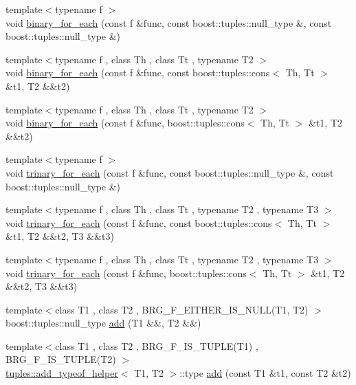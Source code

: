 \begin{DoxyCompactItemize}
\item 
{\footnotesize template$<$typename f $>$ }\\void \hyperlink{namespaceIceBRG_abb18e99d1d2a8d9d4bb6c7a7c6bf612e}{binary\+\_\+for\+\_\+each} (const f \&func, const boost\+::tuples\+::null\+\_\+type \&, const boost\+::tuples\+::null\+\_\+type \&)
\item 
{\footnotesize template$<$typename f , class Th , class Tt , typename T2 $>$ }\\void \hyperlink{namespaceIceBRG_aad1e93a9503d54382cc33627a2fc3fd2}{binary\+\_\+for\+\_\+each} (const f \&func, const boost\+::tuples\+::cons$<$ Th, Tt $>$ \&t1, T2 \&\&t2)
\item 
{\footnotesize template$<$typename f , class Th , class Tt , typename T2 $>$ }\\void \hyperlink{namespaceIceBRG_a493a5731d276b5caebf58044bd458dd8}{binary\+\_\+for\+\_\+each} (const f \&func, boost\+::tuples\+::cons$<$ Th, Tt $>$ \&t1, T2 \&\&t2)
\item 
{\footnotesize template$<$typename f $>$ }\\void \hyperlink{namespaceIceBRG_a6a88a4930e8c382bce5d55d4630c131f}{trinary\+\_\+for\+\_\+each} (const f \&func, const boost\+::tuples\+::null\+\_\+type \&, const boost\+::tuples\+::null\+\_\+type \&)
\item 
{\footnotesize template$<$typename f , class Th , class Tt , typename T2 , typename T3 $>$ }\\void \hyperlink{namespaceIceBRG_ab9fe1517fcdfa97efaf8d8ce9923855b}{trinary\+\_\+for\+\_\+each} (const f \&func, const boost\+::tuples\+::cons$<$ Th, Tt $>$ \&t1, T2 \&\&t2, T3 \&\&t3)
\item 
{\footnotesize template$<$typename f , class Th , class Tt , typename T2 , typename T3 $>$ }\\void \hyperlink{namespaceIceBRG_a79ab6db846823a5ab49f0f530d605512}{trinary\+\_\+for\+\_\+each} (const f \&func, boost\+::tuples\+::cons$<$ Th, Tt $>$ \&t1, T2 \&\&t2, T3 \&\&t3)
\item 
{\footnotesize template$<$class T1 , class T2 , B\+R\+G\+\_\+\+F\+\_\+\+E\+I\+T\+H\+E\+R\+\_\+\+I\+S\+\_\+\+N\+U\+L\+L(\+T1, T2) $>$ }\\boost\+::tuples\+::null\+\_\+type \hyperlink{namespaceIceBRG_a3b6257f50ca02b4f31a39ec81ab1b38d}{add} (T1 \&\&, T2 \&\&)
\item 
{\footnotesize template$<$class T1 , class T2 , B\+R\+G\+\_\+\+F\+\_\+\+I\+S\+\_\+\+T\+U\+P\+L\+E(\+T1) , B\+R\+G\+\_\+\+F\+\_\+\+I\+S\+\_\+\+T\+U\+P\+L\+E(\+T2) $>$ }\\\hyperlink{namespaceIceBRG_1_1tuples_structIceBRG_1_1tuples_1_1add__typeof__helper}{tuples\+::add\+\_\+typeof\+\_\+helper}$<$ T1, T2 $>$\+::type \hyperlink{namespaceIceBRG_a073df9445861d65d982a2defc81f3291}{add} (const T1 \&t1, const T2 \&t2)

\end{DoxyCompactItemize}
